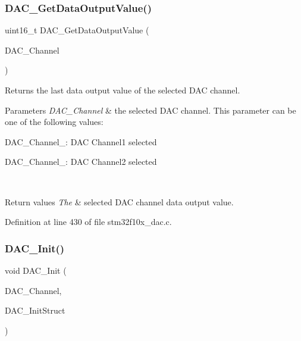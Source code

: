 \subsubsection{\texorpdfstring{D\+A\+C\+\_\+\+Get\+Data\+Output\+Value()}{DAC\_GetDataOutputValue()}}
{\footnotesize\ttfamily uint16\+\_\+t D\+A\+C\+\_\+\+Get\+Data\+Output\+Value (\begin{DoxyParamCaption}\item[{uint32\+\_\+t}]{D\+A\+C\+\_\+\+Channel }\end{DoxyParamCaption})}



Returns the last data output value of the selected D\+AC channel. 


\begin{DoxyParams}{Parameters}
{\em D\+A\+C\+\_\+\+Channel} & the selected D\+AC channel. This parameter can be one of the following values\+: \begin{DoxyItemize}
\item D\+A\+C\+\_\+\+Channel\+\_\+: D\+AC Channel1 selected \item D\+A\+C\+\_\+\+Channel\+\_\+: D\+AC Channel2 selected \end{DoxyItemize}
\\
\hline
\end{DoxyParams}

\begin{DoxyRetVals}{Return values}
{\em The} & selected D\+AC channel data output value. \\
\hline
\end{DoxyRetVals}


Definition at line 430 of file stm32f10x\+\_\+dac.\+c.

\mbox{\label{group___d_a_c___private___functions_ga7c59850468ed4bf0659663fe495441da}} 
\subsubsection{\texorpdfstring{D\+A\+C\+\_\+\+Init()}{DAC\_Init()}}
{\footnotesize\ttfamily void D\+A\+C\+\_\+\+Init (\begin{DoxyParamCaption}\item[{uint32\+\_\+t}]{D\+A\+C\+\_\+\+Channel,  }\item[{\hyperlink{struct_d_a_c___init_type_def}{D\+A\+C\+\_\+\+Init\+Type\+Def} $\ast$}]{D\+A\+C\+\_\+\+Init\+Struct }\end{DoxyParamCaption})}



